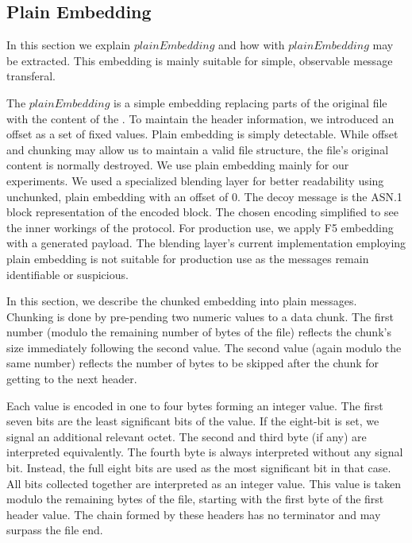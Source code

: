 \subsection{Plain Embedding}
In this section we explain $plainEmbedding$ and how \VortexMessages{} with $plainEmbedding$ may be extracted. This embedding is mainly suitable for simple, observable message transferal.

The $plainEmbedding$ is a simple embedding replacing parts of the original file with the content of the \VortexMessage. To maintain the header information, we introduced an offset as a set of fixed values. Plain embedding is simply detectable. While offset and chunking may allow us to maintain a valid file structure, the file's original content is normally destroyed. We use plain embedding mainly for our experiments. We used a specialized blending layer for better readability using unchunked, plain embedding with an offset of $0$. The decoy message is the ASN.1 block representation of the encoded block. The chosen encoding simplified to see the inner workings of the protocol. For production use, we apply F5 embedding with a generated payload. The blending layer's current implementation employing plain embedding is not suitable for production use as the messages remain identifiable or suspicious.


\label{sec:chunkingPlain}
In this section, we describe the chunked embedding into plain messages. Chunking is done by pre-pending two numeric values to a data chunk. The first number (modulo the remaining number of bytes of the file) reflects the chunk's size immediately following the second value. The second value (again modulo the same number)  reflects the number of bytes to be skipped after the chunk for getting to the next header.

Each value is encoded in one to four bytes forming an integer value. The first seven bits are the least significant bits of the value. If the eight-bit is set, we signal an additional relevant octet. The second and third byte (if any) are interpreted equivalently. The fourth byte is always interpreted without any signal bit. Instead, the full eight bits are used as the most significant bit in that case. All bits collected together are interpreted as an integer value. This value is taken modulo the remaining bytes of the file, starting with the first byte of the first header value. The chain formed by these headers has no terminator and may surpass the file end.

